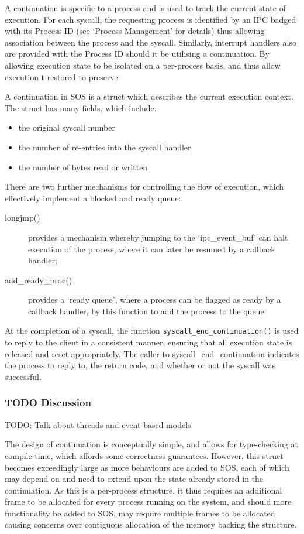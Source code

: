 \documentclass[a4paper,12pt]{article}
\begin{document}
A continuation is specific to a process and is used to track the current state
of execution.  For each syscall, the requesting process is identified by an
IPC badged with its Process ID (see `Process Management' for details) thus
allowing association between the process and the syscall.  Similarly,
interrupt handlers also are provided with the Process ID should it be
utilising a continuation.  By allowing execution state to be isolated on a
per-process basis, and thus allow execution t restored to preserve

A continuation in SOS is a struct which describes the current execution
context.  The struct has many fields, which include:

\begin{itemize}
\item the original syscall number
\item the number of re-entries into the syscall handler
\item the number of bytes read or written
\end{itemize}

There are two further mechanisms for controlling the flow of execution, which
effectively implement a blocked and ready queue:
\begin{description}
\item[longjmp()] provides a mechanism whereby jumping to the `ipc\_event\_buf'
  can halt execution of the process, where it can later be resumed by a
  callback handler;
\item[add\_ready\_proc()] provides a `ready queue', where a process can be
  flagged as ready by a callback handler, by this function to add the process
  to the queue
\end{description}

At the completion of a syscall, the function
\texttt{syscall\_end\_continuation()} is used to reply to the client in a
consistent manner, ensuring that all execution state is released and reset
appropriately.  The caller to syscall\_end\_continuation indicates the process
to reply to, the return code, and whether or not the syscall was successful.

\subsubsection{TODO Discussion}
TODO: Talk about threads and event-based models

The design of continuation is conceptually simple, and allows for
type-checking at compile-time, which affords some correctness guarantees.
However, this struct becomes exceedingly large as more behaviours are added to
SOS, each of which may depend on and need to extend upon the state already
stored in the continuation.  As this is a per-process structure, it thus
requires an additional frame to be allocated for every process running on the
system, and should more functionality be added to SOS, may require multiple
frames to be allocated causing concerns over contiguous allocation of the
memory backing the structure.
\end{document}
